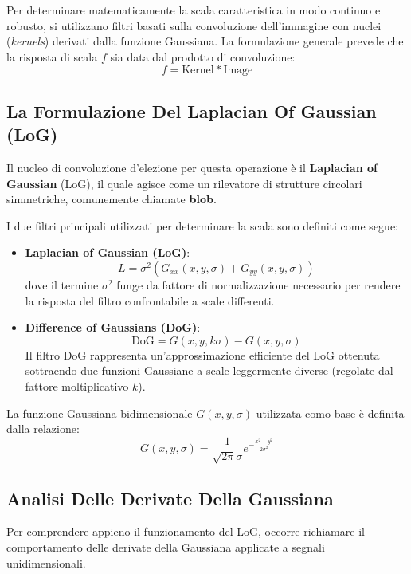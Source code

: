 ﻿\documentclass[11pt, a4paper]{article}
\begin{document}
Per determinare matematicamente la scala caratteristica in modo continuo e robusto, si utilizzano filtri basati sulla convoluzione dell'immagine con nuclei (\emph{kernels}) derivati dalla funzione Gaussiana. La formulazione generale prevede che la risposta di scala $f$ sia data dal prodotto di convoluzione:
\[ f = \text{Kernel} * \text{Image} \]

\subsection{La Formulazione Del Laplacian Of Gaussian (LoG)}

Il nucleo di convoluzione d'elezione per questa operazione è il \textbf{Laplacian of Gaussian} (LoG), il quale agisce come un rilevatore di strutture circolari simmetriche, comunemente chiamate \textbf{blob}.


I due filtri principali utilizzati per determinare la scala sono definiti come segue:
\begin{itemize}
    \item \textbf{Laplacian of Gaussian (LoG)}:
    \[ L = \sigma^2 \left( G_{xx}(x, y, \sigma) + G_{yy}(x, y, \sigma) \right) \]
    dove il termine $\sigma^2$ funge da fattore di normalizzazione necessario per rendere la risposta del filtro confrontabile a scale differenti.
    \item \textbf{Difference of Gaussians (DoG)}:
    \[ \text{DoG} = G(x, y, k\sigma) - G(x, y, \sigma) \]
    Il filtro DoG rappresenta un'approssimazione efficiente del LoG ottenuta sottraendo due funzioni Gaussiane a scale leggermente diverse (regolate dal fattore moltiplicativo $k$).
\end{itemize}

La funzione Gaussiana bidimensionale $G(x, y, \sigma)$ utilizzata como base è definita dalla relazione:
\[ \boxed{G(x, y, \sigma) = \frac{1}{\sqrt{2\pi}\sigma} e^{-\frac{x^2+y^2}{2\sigma^2}}} \]

\subsection{Analisi Delle Derivate Della Gaussiana}

Per comprendere appieno il funzionamento del LoG, occorre richiamare il comportamento delle derivate della Gaussiana applicate a segnali unidimensionali.
\end{document}
